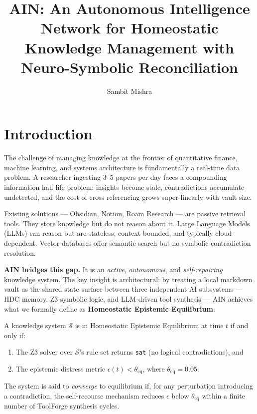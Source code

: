 \documentclass[sigconf]{acmart}
\title{AIN: An Autonomous Intelligence Network for Homeostatic Knowledge Management with Neuro-Symbolic Reconciliation}
\author{Sambit Mishra}
\affiliation{%
  \institution{Independent Researcher}
  \country{India}
}
\begin{document}
\maketitle

\section{Introduction}

The challenge of managing knowledge at the frontier of quantitative finance, machine learning, and systems architecture is fundamentally a real-time data problem. A researcher ingesting 3--5 papers per day faces a compounding information half-life problem: insights become stale, contradictions accumulate undetected, and the cost of cross-referencing grows super-linearly with vault size.

Existing solutions --- Obsidian, Notion, Roam Research --- are passive retrieval tools. They store knowledge but do not reason about it. Large Language Models (LLMs) can reason but are stateless, context-bounded, and typically cloud-dependent. Vector databases offer semantic search but no symbolic contradiction resolution.

\textbf{AIN bridges this gap.} It is an \emph{active}, \emph{autonomous}, and \emph{self-repairing} knowledge system. The key insight is architectural: by treating a local markdown vault as the shared state surface between three independent AI subsystems --- HDC memory, Z3 symbolic logic, and LLM-driven tool synthesis --- AIN achieves what we formally define as \textbf{Homeostatic Epistemic Equilibrium}:

\begin{definition}
A knowledge system $\mathcal{S}$ is in Homeostatic Epistemic Equilibrium at time $t$ if and only if:
\begin{enumerate}
  \item The Z3 solver over $\mathcal{S}$'s rule set returns \texttt{sat} (no logical contradictions), and
  \item The epistemic distress metric $\epsilon(t) < \theta_{\text{eq}}$, where $\theta_{\text{eq}} = 0.05$.
\end{enumerate}
The system is said to \emph{converge} to equilibrium if, for any perturbation introducing a contradiction, the self-recourse mechanism reduces $\epsilon$ below $\theta_{\text{eq}}$ within a finite number of ToolForge synthesis cycles.
\end{definition}
\end{document}
